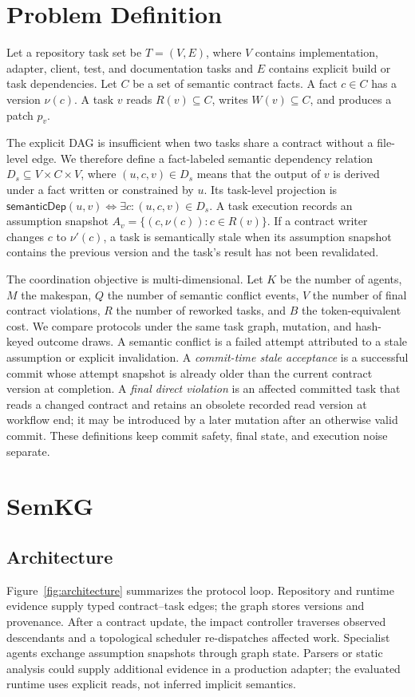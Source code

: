 \documentclass[a4paper,runningheads]{llncs}
\begin{document}
\section{Problem Definition}
Let a repository task set be $T=(V,E)$, where $V$ contains implementation, adapter, client, test, and documentation tasks and $E$ contains explicit build or task dependencies. Let $C$ be a set of semantic contract facts. A fact $c\in C$ has a version $\nu(c)$. A task $v$ reads $R(v)\subseteq C$, writes $W(v)\subseteq C$, and produces a patch $p_v$.

The explicit DAG is insufficient when two tasks share a contract without a file-level edge. We therefore define a fact-labeled semantic dependency relation $D_s\subseteq V\times C\times V$, where $(u,c,v)\in D_s$ means that the output of $v$ is derived under a fact written or constrained by $u$. Its task-level projection is $\mathsf{semanticDep}(u,v)\iff\exists c:(u,c,v)\in D_s$. A task execution records an assumption snapshot $A_v=\{(c,\nu(c)):c\in R(v)\}$. If a contract writer changes $c$ to $\nu'(c)$, a task is semantically stale when its assumption snapshot contains the previous version and the task's result has not been revalidated.

The coordination objective is multi-dimensional. Let $K$ be the number of agents, $M$ the makespan, $Q$ the number of semantic conflict events, $V$ the number of final contract violations, $R$ the number of reworked tasks, and $B$ the token-equivalent cost. We compare protocols under the same task graph, mutation, and hash-keyed outcome draws. A semantic conflict is a failed attempt attributed to a stale assumption or explicit invalidation. A \emph{commit-time stale acceptance} is a successful commit whose attempt snapshot is already older than the current contract version at completion. A \emph{final direct violation} is an affected committed task that reads a changed contract and retains an obsolete recorded read version at workflow end; it may be introduced by a later mutation after an otherwise valid commit. These definitions keep commit safety, final state, and execution noise separate.

\section{SemKG}
\subsection{Architecture}
Figure~\ref{fig:architecture} summarizes the protocol loop. Repository and runtime evidence supply typed contract--task edges; the graph stores versions and provenance. After a contract update, the impact controller traverses observed descendants and a topological scheduler re-dispatches affected work. Specialist agents exchange assumption snapshots through graph state. Parsers or static analysis could supply additional evidence in a production adapter; the evaluated runtime uses explicit reads, not inferred implicit semantics.
\end{document}
